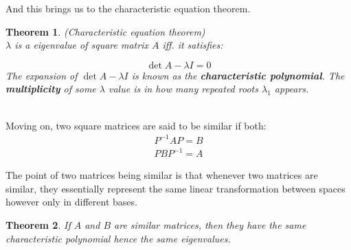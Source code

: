 \documentclass[titlepage]{article}
\newtheorem{thm}{Theorem}[subsection]
\numberwithin{equation}{subsection}
\begin{document}
And this brings us to the characteristic equation theorem.

\begin{thm}(Characteristic equation theorem)
\\
$\lambda$ is a eigenvalue of square matrix $A$ iff. it satisfies:

$$\det{A-\lambda I} = 0$$ The expansion of $\det{A-\lambda I}$ is known as the \textbf{characteristic polynomial}. The \textbf{multiplicity} of some $\lambda$ value is in how many repeated roots $\lambda_{1}$ appears.
\end{thm}
\\

Moving on, two square matrices are said to be similar if both:
\begin{align*}
    P^{-1}AP = B\\
    PBP^{-1} = A
\end{align*}

The point of two matrices being similar is that whenever two matrices are similar, they essentially represent the same linear transformation between spaces however only in different bases.


\begin{thm}
If $A$ and $B$ are similar matrices, then they have the same characteristic polynomial hence the same eigenvalues. 
\end{thm}
\end{document}
